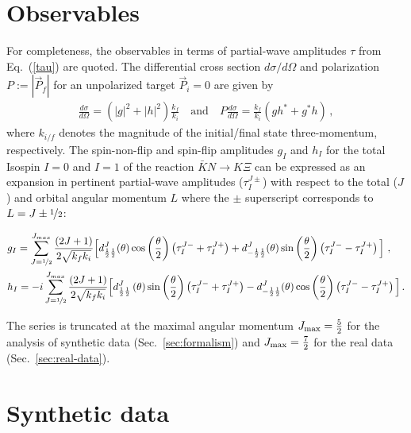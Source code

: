 \documentclass[10pt,aps,prc,superscriptaddress,twoside,twocolumn,nofootinbib,showpacs,preprintnumbers]{revtex4-1}
\begin{document}
\section{Observables}
\label{sec:appA}
For completeness, the observables in terms of partial-wave amplitudes $\tau$ from Eq.~(\ref{tau}) are quoted. The differential cross section $d\sigma/d\Omega$ and polarization $P:=|\vec P_f|$ for an unpolarized target $\vec P_i=0$ are given by
\begin{align}
\frac{d\sigma}{d\Omega}=(|g|^2+|h|^2) \frac{k_f}{k_i}
\,\,\,\,\text{ and }\,\,\,\,
P\frac{d\sigma}{d\Omega}=\frac{k_f}{k_i}(gh^*+g^*h) \,,
\end{align}
where $k_{i/f}$ denotes the magnitude of the initial/final state three-momentum, respectively. The spin-non-flip and spin-flip amplitudes $g_I$ and $h_I$ for the total Isospin $I=0$ and $I=1$ of the reaction $\bar KN\to K\Xi$ can be expressed as an expansion in pertinent partial-wave amplitudes ($\tau_I^{J\pm}$) with respect to the total ($J$) and orbital angular momentum $L$ where the $\pm$ superscript corresponds to $L=J\pm \nicefrac{1}{2}$:
\begin{widetext}
\begin{align}
&g_I=\sum_{J=\nicefrac{1}{2}}^{J_{max}} \frac{(2J+1)}{2 \sqrt{k_f  k_i}} \Big[d^J_{\frac{1}{2} \frac{1}{2}}(\theta)
\cos\left(\frac{\theta}{2}\right)
\left(\tau^{J-}_I+\tau^{J+}_I\right) 
+ d^J_{-\frac{1}{2} \frac{1}{2}}(\theta)
\sin\left(\frac{\theta}{2}\right)
\left(\tau^{J-}_I-\tau^{J+}_I\right)\Big] \ ,\nonumber\\
&h_I=-i\sum_{J=\nicefrac{1}{2}}^{J_{max}} \frac{(2J+1)}{2 \sqrt{k_f  k_i}} \Big[d^J_{\frac{1}{2} \frac{1}{2}}\left(\theta\right)
\sin\left(\frac{\theta}{2}\right)
\left(\tau^{J-}_I+\tau^{J+}_I\right) 
- d^J_{-\frac{1}{2} \frac{1}{2}}(\theta)
\cos\left(\frac{\theta}{2}\right)
\left(\tau^{J-}_I-\tau^{J+}_I\right)\Big]\,.\nonumber
\end{align}
\end{widetext}
The series is truncated at the maximal angular momentum $J_{\rm max}=\frac{5}{2}$ for the analysis of synthetic data (Sec.~\ref{sec:formalism}) and $J_{\rm max}=\frac{7}{2}$  for the real data (Sec.~\ref{sec:real-data}).


\section{Synthetic data}
\label{sec:appB}
\end{document}

